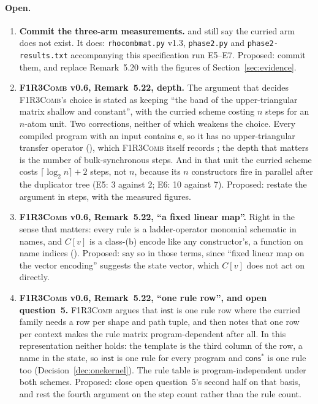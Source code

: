 \documentclass[11pt,a4paper]{article}
\newcommand{\code}[1]{\texttt{#1}}
\newcommand{\Comb}{\textsc{F1R3Comb}}
\newcommand{\ev}{\mathsf{e}}
\theoremstyle{definition}
\theoremstyle{plain}
\newcommand{\inst}{\mathsf{inst}}
\newcommand{\cstar}{\mathsf{cons}^{*}}
\begin{document}
\paragraph{Open.}
\begin{enumerate}[leftmargin=1.8em]

\item \textbf{Commit the three-arm measurements.} \cite[Rem.~5.20]{combspec}
and \cite[\S14, item~2]{combspec} still say the curried arm does not exist.
It does: \code{rhocombmat.py} v1.3, \code{phase2.py} and
\code{phase2-results.txt} accompanying this specification run E5--E7.
Proposed: commit them, and replace Remark~5.20 with the figures of
Section~\ref{sec:evidence}.

\item \textbf{\Comb{} v0.6, Remark~5.22, depth.} The argument that decides
\Comb's choice is stated as keeping ``the band of the upper-triangular matrix
shallow and constant'', with the curried scheme costing $n$ steps for an
$n$-atom unit. Two corrections, neither of which weakens the choice. Every
compiled program with an input contains $\ev$, so it has no upper-triangular
transfer operator (\cite[Thm.~6.1(ii), \S14.2]{matnote}), which \Comb{}
itself records \cite[Req.~10.2]{combspec}; the depth that matters is the
number of bulk-synchronous steps. And in that unit the curried scheme costs
$\lceil\log_{2} n\rceil + 2$ steps, not $n$, because its $n$ constructors fire
in parallel after the duplicator tree (E5: 3 against 2; E6: 10 against 7).
Proposed: restate the argument in steps, with the measured figures.

\item \textbf{\Comb{} v0.6, Remark~5.22, ``a fixed linear map''.} Right in
the sense that matters: every rule is a ladder-operator monomial schematic in
names, and $C[v]$ is a class-(b) encode like any constructor's, a function
on name indices (\cite[\S5.1]{matnote}). Proposed: say so in those terms,
since ``fixed linear map on the vector encoding'' suggests the state vector,
which $C[v]$ does not act on directly.

\item \textbf{\Comb{} v0.6, Remark~5.22, ``one rule row'', and open
question~5.} \Comb{} argues that $\inst$ is one rule row where the curried
family needs a row per shape and path tuple, and then notes that one row per
context makes the rule matrix program-dependent after all. In this
representation neither holds: the template is the third column of the row, a
name in the state, so $\inst$ is one rule for every program and $\cstar$ is
one rule too (Decision~\ref{dec:onekernel}). The rule table is
program-independent under both schemes. Proposed: close open question~5's
second half on that basis, and rest the fourth argument on the step count
rather than the rule count.


\end{enumerate}
\end{document}
